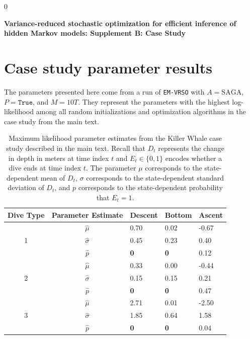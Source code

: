 \documentclass[12pt]{article}
\newcommand{\blind}{0}
\begin{document}
\blind
{
  \bigskip
  \bigskip
  \bigskip
  \begin{center}
    {\LARGE\bf Variance-reduced stochastic optimization for efficient inference of hidden Markov models: Supplement B: Case Study}
  \end{center}
  \medskip
} \fi

\newpage
{} %

\section{Case study parameter results}

The parameters presented here come from a run of \texttt{EM-VRSO} with $A = \text{SAGA}$, $P = \texttt{True}$, and $M=10T$. They represent the parameters with the highest log-likelihood among all random initializations and optimization algorithms in the case study from the main text. 

\begin{table}[H]
\centering
\begin{tabular}{c|c|lll}
\multicolumn{1}{l|}{Dive Type} & Parameter Estimate & Descent & Bottom & Ascent \\ \hline
\multirow{3}{*}{1}            & $\hat \mu$     & 0.70    & 0.02   & -0.67  \\
                              & $\hat \sigma$  & 0.45    & 0.23   & 0.40   \\
                              & $\hat p$       & \bf{0}  & \bf{0} & 0.12   \\ \hline 
\multirow{3}{*}{2}            & $\hat \mu$     & 0.33    & 0.00   & -0.44  \\
                              & $\hat \sigma$  & 0.15    & 0.15   & 0.21   \\
                              & $\hat p$       & \bf{0}  & \bf{0} & 0.47   \\ \hline
\multirow{3}{*}{3}            & $\hat \mu$     & 2.71    & 0.01   & -2.50  \\
                              & $\hat \sigma$  & 1.85    & 0.64   & 1.58   \\
                              & $\hat p$       & \bf{0}  & \bf{0} & 0.04  
\end{tabular}
\caption{Maximum likelihood parameter estimates from the Killer Whale case study described in the main text. Recall that $D_t$ represents the change in depth in meters at time index $t$ and $E_t \in \{0,1\}$ encodes whether a dive ends at time index $t$. The parameter $\mu$ corresponds to the state-dependent mean of $D_t$, $\sigma$ corresponds to the state-dependent standard deviation of $D_t$, and $p$ corresponds to the state-dependent probability that $E_t=1$.}
\end{table}
\end{document}
